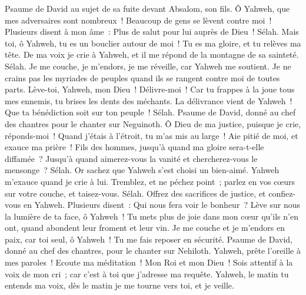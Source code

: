 \begin{multicols}{2}
\VerseOne{}Psaume de David au sujet de sa fuite devant Absalom, son fils.
Ô Yahweh, que mes adversaires sont nombreux~! Beaucoup de gens se lèvent contre moi~!
Plusieurs disent à mon âme~: Plus de salut pour lui auprès de Dieu~! Sélah.
Mais toi, ô Yahweh, tu es un bouclier autour de moi~! Tu es ma gloire, et tu relèves ma tête.
De ma voix je crie à Yahweh, et il me répond de la montagne de sa sainteté. Sélah.
Je me couche, je m'endors, je me réveille, car Yahweh me soutient.
Je ne crains pas les myriades de peuples quand ils se rangent contre moi de toutes parts.
Lève-toi, Yahweh, mon Dieu~! Délivre-moi~! Car tu frappes à la joue tous mes ennemis, tu brises les dents des méchants.
La délivrance vient de Yahweh~! Que ta bénédiction soit sur ton peuple~! Sélah.
\VerseOne{}Psaume de David, donné au chef des chantres pour le chanter sur Neguinoth.
Ô Dieu de ma justice, puisque je crie, réponds-moi~! Quand j'étais à l'étroit, tu m'as mis au large~! Aie pitié de moi, et exauce ma prière~!
Fils des hommes, jusqu'à quand ma gloire sera-t-elle diffamée~? Jusqu'à quand aimerez-vous la vanité et chercherez-vous le mensonge~? Sélah.
Or sachez que Yahweh s'est choisi un bien-aimé. Yahweh m'exauce quand je crie à lui.
Tremblez, et ne péchez point~; parlez en vos cœurs sur votre couche, et taisez-vous. Sélah.
Offrez des sacrifices de justice, et confiez-vous en Yahweh.
Plusieurs disent~: Qui nous fera voir le bonheur~? Lève sur nous la lumière de ta face, ô Yahweh~!
Tu mets plus de joie dans mon cœur qu'ils n'en ont, quand abondent leur froment et leur vin.
Je me couche et je m'endors en paix, car toi seul, ô Yahweh~! Tu me fais reposer en sécurité.
\VerseOne{}Psaume de David, donné au chef des chantres, pour le chanter sur Nehiloth.
Yahweh, prête l'oreille à mes paroles~! Ecoute ma méditation~!
Mon Roi et mon Dieu~! Sois attentif à la voix de mon cri~; car c'est à toi que j'adresse ma requête.
Yahweh, le matin tu entends ma voix, dès le matin je me tourne vers toi, et je veille.

\end{multicols}
